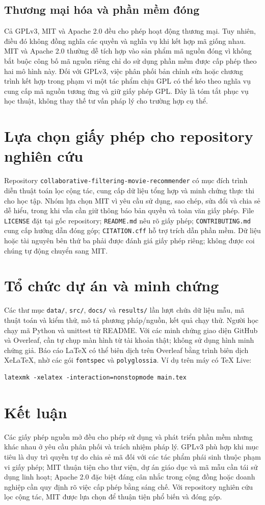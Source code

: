 \documentclass[12pt,a4paper]{article}
\begin{document}
\subsection{Thương mại hóa và phần mềm đóng}
Cả GPLv3, MIT và Apache 2.0 đều cho phép hoạt động thương mại. Tuy nhiên, điều đó không đồng nghĩa các quyền và nghĩa vụ khi kết hợp mã giống nhau. MIT và Apache 2.0 thường dễ tích hợp vào sản phẩm mã nguồn đóng vì không bắt buộc công bố mã nguồn riêng chỉ do sử dụng phần mềm được cấp phép theo hai mô hình này. Đối với GPLv3, việc phân phối bản chỉnh sửa hoặc chương trình kết hợp trong phạm vi một tác phẩm chịu GPL có thể kéo theo nghĩa vụ cung cấp mã nguồn tương ứng và giữ giấy phép GPL. Đây là tóm tắt phục vụ học thuật, không thay thế tư vấn pháp lý cho trường hợp cụ thể.
\section{Lựa chọn giấy phép cho repository nghiên cứu}
Repository \texttt{collaborative-filtering-movie-recommender} có mục đích trình diễn thuật toán lọc cộng tác, cung cấp dữ liệu tổng hợp và minh chứng thực thi cho học tập. Nhóm lựa chọn MIT vì yêu cầu sử dụng, sao chép, sửa đổi và chia sẻ dễ hiểu, trong khi vẫn cần giữ thông báo bản quyền và toàn văn giấy phép. File \texttt{LICENSE} đặt tại gốc repository; \texttt{README.md} nêu rõ giấy phép; \texttt{CONTRIBUTING.md} cung cấp hướng dẫn đóng góp; \texttt{CITATION.cff} hỗ trợ trích dẫn phần mềm. Dữ liệu hoặc tài nguyên bên thứ ba phải được đánh giá giấy phép riêng; không được coi chúng tự động chuyển sang MIT.
\section{Tổ chức dự án và minh chứng}
Các thư mục \texttt{data/}, \texttt{src/}, \texttt{docs/} và \texttt{results/} lần lượt chứa dữ liệu mẫu, mã thuật toán và kiểm thử, mô tả phương pháp/nguồn, kết quả chạy thử. Người học chạy mã Python và unittest từ README. Với các minh chứng giao diện GitHub và Overleaf, cần tự chụp màn hình từ tài khoản thật; không sử dụng hình minh chứng giả. Báo cáo LaTeX có thể biên dịch trên Overleaf bằng trình biên dịch XeLaTeX, nhờ các gói \texttt{fontspec} và \texttt{polyglossia}. Ví dụ trên máy có TeX Live:
\begin{verbatim}
latexmk -xelatex -interaction=nonstopmode main.tex
\end{verbatim}
\section{Kết luận}
Các giấy phép nguồn mở đều cho phép sử dụng và phát triển phần mềm nhưng khác nhau ở yêu cầu phân phối và trách nhiệm pháp lý. GPLv3 phù hợp khi mục tiêu là duy trì quyền tự do chia sẻ mã đối với các tác phẩm phái sinh thuộc phạm vi giấy phép; MIT thuận tiện cho thư viện, dự án giáo dục và mã mẫu cần tái sử dụng linh hoạt; Apache 2.0 đặc biệt đáng cân nhắc trong cộng đồng hoặc doanh nghiệp cần quy định rõ việc cấp phép bằng sáng chế. Với repository nghiên cứu lọc cộng tác, MIT được lựa chọn để thuận tiện phổ biến và đóng góp.
\end{document}
